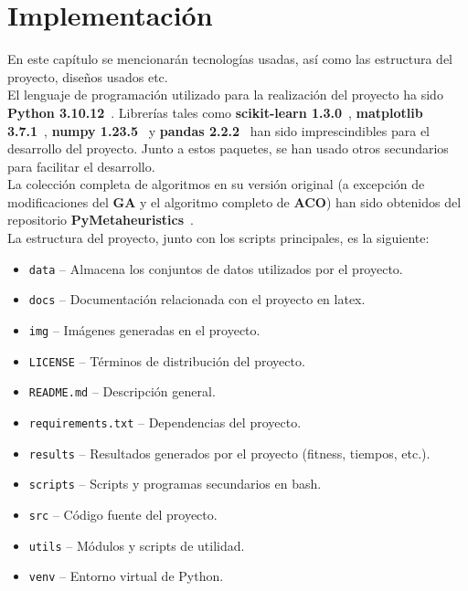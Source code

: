\chapter{Implementación}
En este capítulo se mencionarán tecnologías usadas, así como las estructura del proyecto, diseños usados etc.\\[6pt]
El lenguaje de programación utilizado para la realización del proyecto ha sido \textbf{Python 3.10.12}~\cite{VanRossum2009}. Librerías tales como \textbf{scikit-learn 1.3.0}~\cite{scikit-learn}, \textbf{matplotlib 3.7.1}~\cite{Hunter2007}, \textbf{numpy 1.23.5}~\cite{harris2020array} y \textbf{pandas 2.2.2}~\cite{reback2020pandas} han sido imprescindibles para el desarrollo del proyecto. Junto a estos paquetes, se han usado otros secundarios para facilitar el desarrollo.\\[6pt]
La colección completa de algoritmos en su versión original (a excepción de modificaciones del \textbf{GA} y el algoritmo completo de \textbf{ACO}) han sido obtenidos del repositorio \textbf{PyMetaheuristics}~\cite{valdecy_pyMetaheuristic}.\\[6pt]
La estructura del proyecto, junto con los scripts principales, es la siguiente:

\begin{itemize}
    \item \texttt{data} -- Almacena los conjuntos de datos utilizados por el proyecto.
    \item \texttt{docs} -- Documentación relacionada con el proyecto en latex.
    \item \texttt{img} -- Imágenes generadas en el proyecto.
    \item \texttt{LICENSE} -- Términos de distribución del proyecto.
    \item \texttt{README.md} -- Descripción general.
    \item \texttt{requirements.txt} -- Dependencias del proyecto.
    \item \texttt{results} -- Resultados generados por el proyecto (fitness, tiempos, etc.).
    \item \texttt{scripts} -- Scripts y programas secundarios en bash.
    \item \texttt{src} -- Código fuente del proyecto.
    \item \texttt{utils} -- Módulos y scripts de utilidad.
    \item \texttt{venv} -- Entorno virtual de Python.
\end{itemize}

